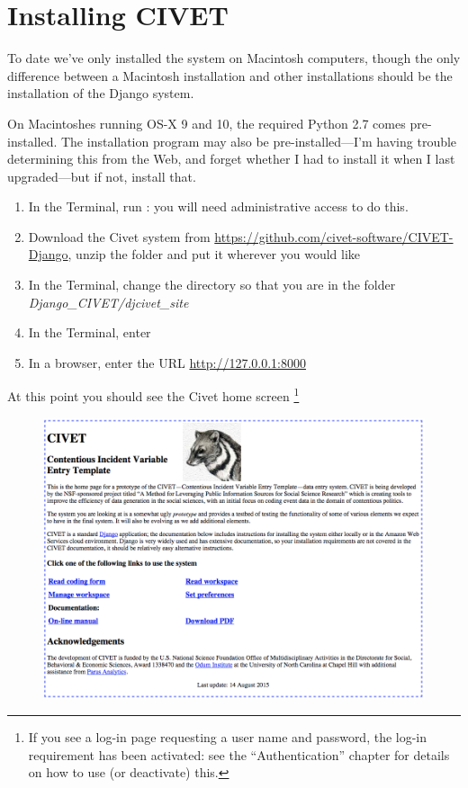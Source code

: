 \documentclass[letterpaper,10pt,english]{sphinxmanual}
\begin{document}
\chapter{Installing CIVET}
\label{installing:installing-civet}\label{installing::doc}
To date we’ve only installed the system on Macintosh computers, though
the only difference between a Macintosh installation and other
installations should be the installation of the Django system.

On Macintoshes running OS-X 9 and 10, the required Python 2.7 comes
pre-installed. The  installation program may also be
pre-installed—I’m having trouble determining this from the Web, and
forget whether I had to install it when I last upgraded—but if not,
install that.
\begin{enumerate}
\item {} 
In the Terminal, run : you will need
administrative access to do this.

\item {} 
Download the Civet system from
\href{https://github.com/civet-software/CIVET-Django}{https://github.com/civet-software/CIVET-Django}, unzip the folder and
put it wherever you would like

\item {} 
In the Terminal, change the directory so that you are in the folder
\emph{Django\_CIVET/djcivet\_site}

\item {} 
In the Terminal, enter 

\item {} 
In a browser, enter the URL \href{http://127.0.0.1:8000}{http://127.0.0.1:8000}

\end{enumerate}

At this point you should see the Civet home screen \footnote{
If you see a log-in page requesting a user name and password, the log-in requirement
has been activated: see the “Authentication” chapter for details on how to use
(or deactivate) this.
}
\begin{figure}[htbp]
\centering

\includegraphics[width=1.000\linewidth]{civethome.png}
\end{figure}
\end{document}
